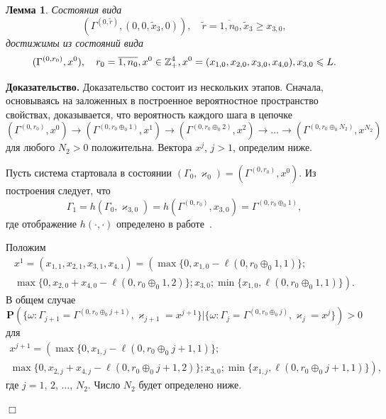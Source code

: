\documentclass[12pt]{book}
\theoremstyle{plain}
\newtheorem{lemma}{\indent Лемма}
\renewcommand{\Pr}{{\mathbf P}}
\theoremstyle{remark}
\theoremstyle{plain}
\theoremstyle{definition}
\renewenvironment{proof}{\indent\textbf{Доказательство. }}{\hfill$\Box$}
\begin{document}
\begin{lemma}\label{classification:arithm:1}
Состояния вида 
$$(\Gamma^{(0,  \tilde{r})}, (0,  0,  \tilde{x}_3,  0)),  \quad \tilde{r} = \overline{1,  n_0},  \tilde{x}_3 \geqslant x_{3,  0}, $$
достижимы из состояний вида 
$$(\Gamma^{(0,  r_0)},  x^0),  \quad r_0=\overline{1,  n_0},  x^0 \hm\in \mathbb{Z}_+^4,  x^0\hm=(x_{1, 0},  x_{2, 0},  x_{3, 0},  x_{4, 0}),  x_{3,  0} \leqslant L.$$
\end{lemma}
\begin{proof}
Доказательство состоит из нескольких этапов. Сначала, основываясь на заложенных в построенное вероятностное пространство свойствах, доказывается,  что вероятность каждого шага в цепочке
\begin{equation*}
(\Gamma^{(0, r_0)}, x^0) \rightarrow (\Gamma^{(0, r_0\oplus_{0}1)}, x^1) \rightarrow (\Gamma^{(0, r_0\oplus_{0}2)},  x^2) \rightarrow \ldots \rightarrow (\Gamma^{(0,  r_0\oplus_{0} N_2)},  x^{N_2})
\end{equation*}
для любого $N_2 > 0$ положительна. Вектора $x^j$,  $j>1$,  определим ниже.

Пусть система стартовала в состоянии $(\Gamma_{0},  \varkappa_{0}) = (\Gamma^{(0, r_0)},  x^0)$.
Из построения следует, что 
\begin{equation*}
\Gamma_1 = h(\Gamma_0, \varkappa_{3, 0}) = h(\Gamma^{(0, r_0)},  x_{3, 0}) = \Gamma^{(0, r_0\oplus_{0}1)},
\end{equation*}
где отображение $h(\cdot,\cdot)$ определено в работе~\cite{Kocheganov:2018}.

Положим
\begin{multline*}
x^1 =(x_{1, 1}, x_{2, 1}, x_{3, 1}, x_{4, 1}) =\left(\max{\{0,  x_{1, 0} - \ell(0, r_0\oplus_{0}1, 1)\}}; \right. \\
\left. \max{\{0,  x_{2, 0} + x_{4, 0}  - \ell(0, r_0\oplus_{0}1, 2)\}}; x_{3, 0};\min{\{x_{1, 0}, \ell(0, r_0\oplus_{0}1, 1)\}}\right).
\end{multline*}
В общем случае
\begin{equation*}
\Pr (\{\omega\colon\Gamma_{j+1}=\Gamma^{(0,  r_0\oplus_{0}j+1)}, \varkappa_{j+1}=x^{j+1} \} |\{\omega\colon \Gamma_{j}=\Gamma^{(0,  r_0\oplus_{0}j)},  \varkappa_j=x^j\}) > 0 
\end{equation*}
для 
\begin{multline*}
x^{j+1}  =\left(\max{\{0,  x_{1,  j} - \ell(0,  r_0\oplus_{0}j+1,  1)\}}; \right. \\
\left. \max{\{0,  x_{2, j} + x_{4, j}  - \ell(0,  r_0\oplus_{0}j+1,  2)\}}; x_{3,  0};\min{\{x_{1,  j},  \ell(0,  r_0\oplus_{0}j+1,  1)\}}\right), 
\end{multline*}
где $j = 1$,  $2$,  $\ldots$,  $N_2$. Число $N_2$ будет определено ниже.


\end{proof}
\end{document}

